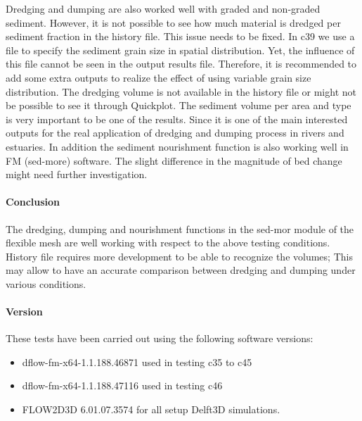 Dredging and dumping are also worked well with graded and non-graded sediment. However, it is not possible to see how much  material is dredged per sediment fraction in the history file. This issue needs to be fixed.
In c39 we use a file to specify the sediment grain size in spatial distribution. Yet, the influence of this file cannot be seen in the output results file. Therefore, it is recommended to add some extra outputs to realize the effect of using variable grain size distribution.
The dredging volume is not available in the history file or might not be possible to see it through Quickplot. The sediment volume per area and type is very important to be one of the results. Since it is one of the  main interested outputs for the real application of dredging and dumping process in rivers and estuaries.
In addition the sediment nourishment function is also working well in FM (sed-more) software. The slight difference in the magnitude of bed change might need further investigation.
\paragraph*{Conclusion}
The dredging, dumping and nourishment functions in the sed-mor module of the flexible mesh are well working with respect to the above testing conditions. History file requires more development to be able to recognize the volumes; This may allow to have an accurate comparison between dredging and dumping under various conditions.
\paragraph*{Version}
These tests have been carried out using the following software versions:
\begin{itemize}
	\item[$\bullet$] dflow-fm-x64-1.1.188.46871 used in testing c35 to c45
	\item[$\bullet$] dflow-fm-x64-1.1.188.47116 used in testing c46 
	\item[$\bullet$] FLOW2D3D 6.01.07.3574 for all setup Delft3D simulations.
\end{itemize}


